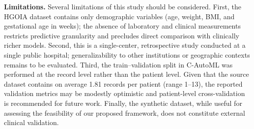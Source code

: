 \documentclass[diagnostics,article,submit,pdftex,moreauthors]{Definitions/mdpi}
\begin{document}
\textbf{Limitations.}
Several limitations of this study should be considered.
First, the \ac{HGOIA} dataset contains only demographic variables (age, weight,
\ac{BMI}, and gestational age in weeks); the absence of laboratory and clinical
measurements restricts predictive granularity and precludes direct comparison
with clinically richer models.
Second, this is a single-center, retrospective study conducted at a single
public hospital; generalizability to other institutions or geographic contexts
remains to be evaluated.
Third, the train--validation split in \ac{C-AutoML} was performed at the record
level rather than the patient level. Given that the source dataset contains on
average 1.81 records per patient (range 1--13), the reported
validation metrics may be modestly optimistic and patient-level
cross-validation is recommended for future work.
Finally, the synthetic dataset, while useful for assessing the
feasibility of our proposed framework, does not constitute external clinical validation.

\end{document}
